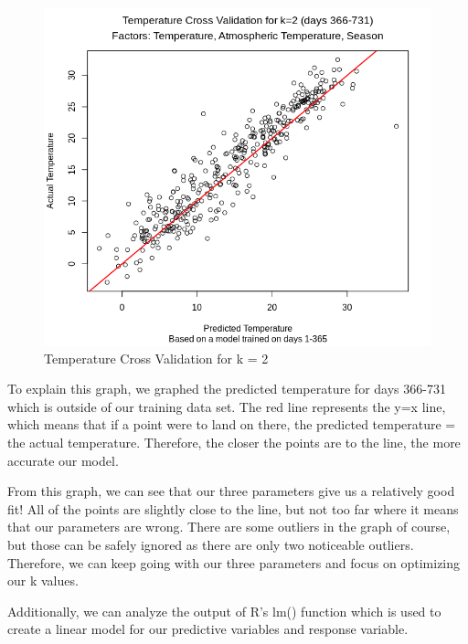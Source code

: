 \documentclass[12pt]{article}
\begin{document}
\begin{figure}[H]
	\centering
  	\includegraphics[width=112mm]{tempxvalidk=2.png}
 	\caption{Temperature Cross Validation for k = 2}
 	\label{fig:tmpxvalid2}
\end{figure} 

To explain this graph, we graphed the predicted temperature for days 366-731 which is outside of our training data set. The red line represents the y=x line, which means that if a point were to land on there, the predicted temperature = the actual temperature. Therefore, the closer the points are to the line, the more accurate our model.

From this graph, we can see that our three parameters give us a relatively good fit! All of the points are slightly close to the line, but not too far where it means that our parameters are wrong. There are some outliers in the graph of course, but those can be safely ignored as there are only two noticeable outliers. Therefore, we can keep going with our three parameters and focus on optimizing our k values. 

Additionally, we can analyze the output of R's lm() function which is used to create a linear model for our predictive variables and response variable.
\end{document}
